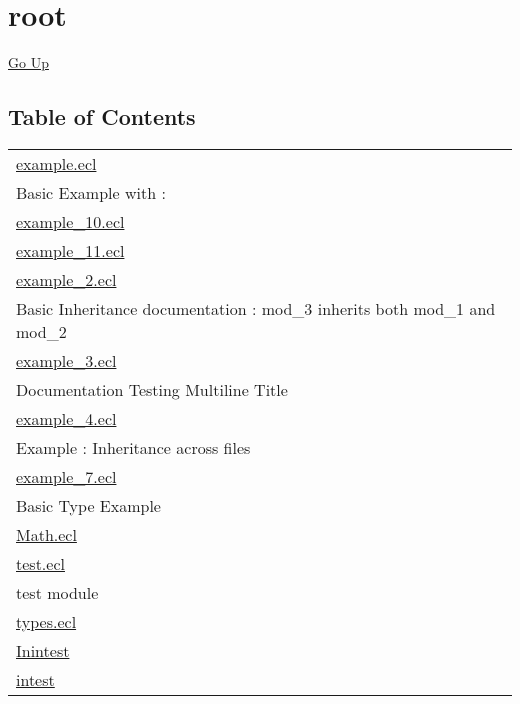 \chapter*{\color{headtoc} root}
\hypertarget{ecldoc:toc:root}{}
\hyperlink{ecldoc:toc:}{Go Up}


\section*{Table of Contents}
{\renewcommand{\arraystretch}{1.5}
\begin{longtable}{|p{\textwidth}|}
\hline
\hyperlink{ecldoc:toc:example}{example.ecl} \\
Basic Example with : \\
\hline
\hyperlink{ecldoc:toc:example_10}{example\_10.ecl} \\
\hline
\hyperlink{ecldoc:toc:example_11}{example\_11.ecl} \\
\hline
\hyperlink{ecldoc:toc:example_2}{example\_2.ecl} \\
Basic Inheritance documentation : mod\_3 inherits both mod\_1 and mod\_2 \\
\hline
\hyperlink{ecldoc:toc:example_3}{example\_3.ecl} \\
Documentation Testing Multiline Title \\
\hline
\hyperlink{ecldoc:toc:example_4}{example\_4.ecl} \\
Example : Inheritance across files \\
\hline
\hyperlink{ecldoc:toc:example_7}{example\_7.ecl} \\
Basic Type Example \\
\hline
\hyperlink{ecldoc:toc:Math}{Math.ecl} \\
\hline
\hyperlink{ecldoc:toc:test}{test.ecl} \\
test module \\
\hline
\hyperlink{ecldoc:toc:types}{types.ecl} \\
\hline
\hyperlink{ecldoc:toc:root/Inintest}{Inintest} \\
\hline
\hyperlink{ecldoc:toc:root/intest}{intest} \\
\hline
\end{longtable}
}













